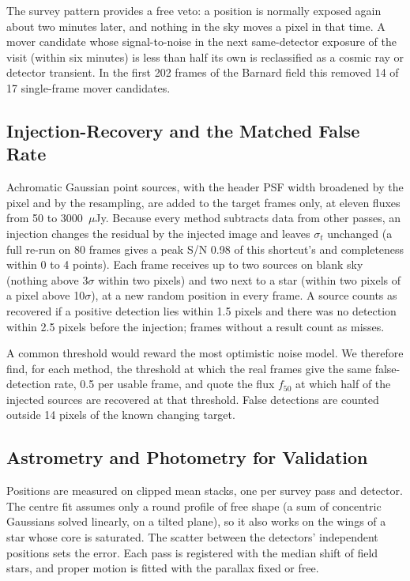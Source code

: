 \documentclass[conference]{IEEEtran}
\begin{document}
The survey pattern provides a free veto: a position is normally exposed again about two minutes later, and nothing in the sky moves a pixel in that time. A mover candidate whose signal-to-noise in the next same-detector exposure of the visit (within six minutes) is less than half its own is reclassified as a cosmic ray or detector transient. In the first 202 frames of the Barnard field this removed 14 of 17 single-frame mover candidates.

\subsection{Injection-Recovery and the Matched False Rate}

Achromatic Gaussian point sources, with the header PSF width broadened by the pixel and by the resampling, are added to the target frames only, at eleven fluxes from 50 to 3000~$\mu$Jy. Because every method subtracts data from other passes, an injection changes the residual by the injected image and leaves $\sigma_{t}$ unchanged (a full re-run on 80 frames gives a peak S/N 0.98 of this shortcut's and completeness within 0 to 4 points). Each frame receives up to two sources on blank sky (nothing above 3$\sigma$ within two pixels) and two next to a star (within two pixels of a pixel above 10$\sigma$), at a new random position in every frame. A source counts as recovered if a positive detection lies within 1.5 pixels and there was no detection within 2.5 pixels before the injection; frames without a result count as misses.

A common threshold would reward the most optimistic noise model. We therefore find, for each method, the threshold at which the real frames give the same false-detection rate, 0.5 per usable frame, and quote the flux $f_{50}$ at which half of the injected sources are recovered at that threshold. False detections are counted outside 14 pixels of the known changing target.

\subsection{Astrometry and Photometry for Validation}

Positions are measured on clipped mean stacks, one per survey pass and detector. The centre fit assumes only a round profile of free shape (a sum of concentric Gaussians solved linearly, on a tilted plane), so it also works on the wings of a star whose core is saturated. The scatter between the detectors' independent positions sets the error. Each pass is registered with the median shift of field stars, and proper motion is fitted with the parallax fixed or free.
\end{document}
